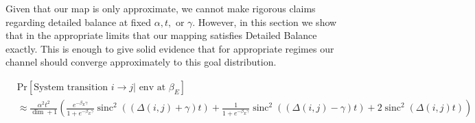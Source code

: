 \documentclass{article}
\newcommand{\parens}[1]{\left( #1 \right)}
\newcommand{\prob}[1]{\text{Pr}\left[ #1 \right]}
\DeclareMathOperator{\sinc}{sinc}
\begin{document}
Given that our map is only approximate, we cannot make rigorous claims regarding detailed balance at fixed $\alpha, t,$ or $\gamma$. However, in this section we show that in the appropriate limits that our mapping satisfies Detailed Balance exactly. This is enough to give solid evidence that for appropriate regimes our channel should converge approximately to this goal distribution.



\begin{align}
    &\prob{\text{System transition } i \to j | \text{ env at } \beta_E} \nonumber \\
    &\approx \frac{\alpha^2 t^2}{\dim + 1} \parens {\frac{e^{-\beta_E \gamma}}{1 + e^{-\beta_E \gamma}}  \sinc^2((\Delta(i,j) + \gamma)t) + \frac{1}{1 + e^{-\beta_E \gamma}} \sinc^2 ((\Delta(i,j) - \gamma)t) + 2 \sinc^2(\Delta(i,j) t)} \nonumber
\end{align}
\end{document}
